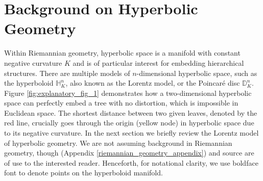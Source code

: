 \section{Background on Hyperbolic Geometry}

Within Riemannian geometry, hyperbolic space is a manifold with constant negative curvature $K$ and is of particular interest for embedding hierarchical structures. There are multiple models of $n$-dimensional hyperbolic space, such as the hyperboloid $\mathbb{H}_K^n$, also known as the Lorentz model, or the Poincar\'e disc $\mathbb{D}_K^n$. Figure \ref{fig:explanatory_fig_1} demonstrates how a two-dimensional hyperbolic space can perfectly embed a tree with no distortion, which is impossible in Euclidean space. The shortest distance between two given leaves, denoted by the red line, crucially goes through the origin (yellow node) in hyperbolic space due to its negative curvature. In the next section we briefly review the Lorentz model of hyperbolic geometry. We are not assuming background in Riemannian geometry, though (Appendix \ref{riemannian_geometry_appendix}) and source \cite{Ratcliffe94} are of use to the interested reader. Henceforth, for notational clarity, we use boldface font to denote points on the hyperboloid manifold.



